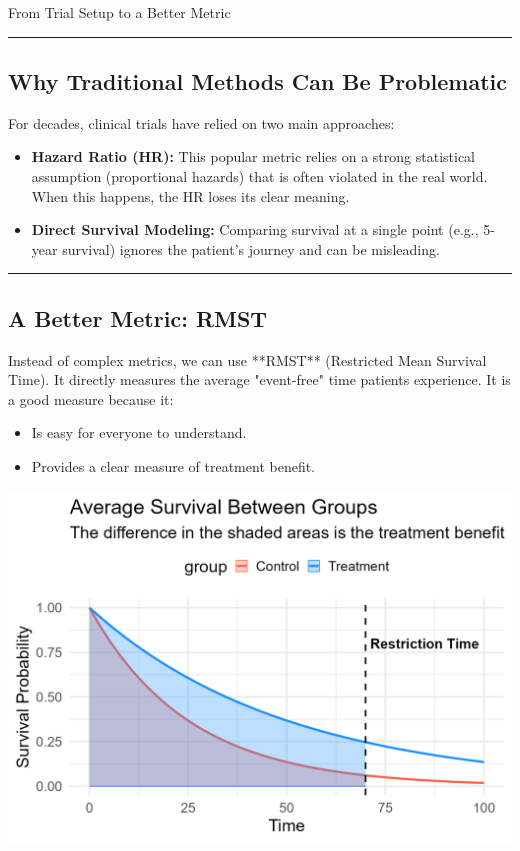 \documentclass[a0,landscape]{a0poster}
\begin{document}
\begin{multicols}{3}
\begin{posterbox}{From Trial Setup to a Better Metric}
    \vspace{0.5cm}\hrule\vspace{0.5cm}
    
     \subsection*{ Why Traditional Methods Can Be Problematic}
    
    For decades, clinical trials have relied on two main approaches:
    \begin{itemize} \itemsep=0.75em
        \item \textbf{Hazard Ratio (HR):} This popular metric relies on a strong statistical assumption (proportional hazards) that is often violated in the real world. When this happens, the HR loses its clear meaning.
        \item \textbf{Direct Survival Modeling:} Comparing survival at a single point (e.g., 5-year survival) ignores the patient's journey and can be misleading.
    \end{itemize}
    
    \vspace{0.5cm}\hrule\vspace{0.5cm}

    \subsection*{ A Better Metric: RMST}
    
    Instead of complex metrics, we can use **RMST** (Restricted Mean Survival Time). It directly measures the average "event-free" time patients experience. It is a good measure because it:
    \begin{itemize} \itemsep=0.5em
        \item[\checkmark]  Is easy for everyone to understand.
        \item[\checkmark]  Provides a clear measure of treatment benefit.
    \end{itemize}
    
    \begin{center}
        \includegraphics[width=0.9\linewidth]{rmst_causal_plot.png}
    \end{center}
\end{posterbox}




\end{multicols}
\end{document}
